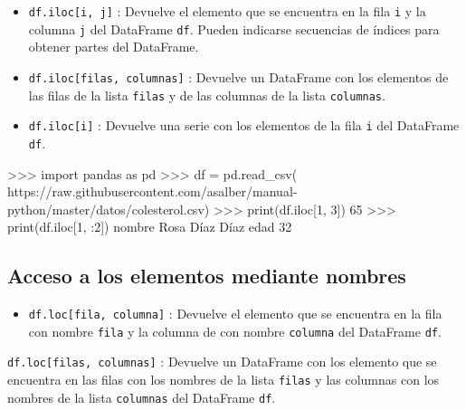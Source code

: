 \documentclass[
  spanish,
  a4paper,
]{scrreport}
\newenvironment{Shaded}{\begin{snugshade}}{\end{snugshade}}
\newcommand{\BuiltInTok}[1]{\textcolor[rgb]{0.00,0.23,0.31}{#1}}
\newcommand{\DecValTok}[1]{\textcolor[rgb]{0.68,0.00,0.00}{#1}}
\newcommand{\ImportTok}[1]{\textcolor[rgb]{0.00,0.46,0.62}{#1}}
\newcommand{\NormalTok}[1]{\textcolor[rgb]{0.00,0.23,0.31}{#1}}
\newcommand{\OperatorTok}[1]{\textcolor[rgb]{0.37,0.37,0.37}{#1}}
\newcommand{\StringTok}[1]{\textcolor[rgb]{0.13,0.47,0.30}{#1}}
\providecommand{\tightlist}{%
  \setlength{\itemsep}{0pt}\setlength{\parskip}{0pt}}
\begin{document}
\begin{itemize}
\item
  \texttt{df.iloc{[}i,\ j{]}} : Devuelve el elemento que se encuentra en
  la fila \texttt{i} y la columna \texttt{j} del DataFrame \texttt{df}.
  Pueden indicarse secuencias de índices para obtener partes del
  DataFrame.
\item
  \texttt{df.iloc{[}filas,\ columnas{]}} : Devuelve un DataFrame con los
  elementos de las filas de la lista \texttt{filas} y de las columnas de
  la lista \texttt{columnas}.
\item
  \texttt{df.iloc{[}i{]}} : Devuelve una serie con los elementos de la
  fila \texttt{i} del DataFrame \texttt{df}.
\end{itemize}

\begin{Shaded}
\begin{Highlighting}[]
\OperatorTok{\textgreater{}\textgreater{}\textgreater{}} \ImportTok{import}\NormalTok{ pandas }\ImportTok{as}\NormalTok{ pd}
\OperatorTok{\textgreater{}\textgreater{}\textgreater{}}\NormalTok{ df }\OperatorTok{=}\NormalTok{ pd.read\_csv(}
\StringTok{\textquotesingle{}https://raw.githubusercontent.com/asalber/manual{-}python/master/datos/colesterol.csv\textquotesingle{}}\NormalTok{)}
\OperatorTok{\textgreater{}\textgreater{}\textgreater{}} \BuiltInTok{print}\NormalTok{(df.iloc[}\DecValTok{1}\NormalTok{, }\DecValTok{3}\NormalTok{])}
\DecValTok{65}
\OperatorTok{\textgreater{}\textgreater{}\textgreater{}} \BuiltInTok{print}\NormalTok{(df.iloc[}\DecValTok{1}\NormalTok{, :}\DecValTok{2}\NormalTok{])}
\NormalTok{nombre     Rosa Díaz Díaz}
\NormalTok{edad                   }\DecValTok{32}
\end{Highlighting}
\end{Shaded}

\subsection{Acceso a los elementos mediante
nombres}\label{acceso-a-los-elementos-mediante-nombres}

\begin{itemize}
\tightlist
\item
  \texttt{df.loc{[}fila,\ columna{]}} : Devuelve el elemento que se
  encuentra en la fila con nombre \texttt{fila} y la columna de con
  nombre \texttt{columna} del DataFrame \texttt{df}.
\end{itemize}

\texttt{df.loc{[}filas,\ columnas{]}} : Devuelve un DataFrame con los
elemento que se encuentra en las filas con los nombres de la lista
\texttt{filas} y las columnas con los nombres de la lista
\texttt{columnas} del DataFrame \texttt{df}.
\end{document}
